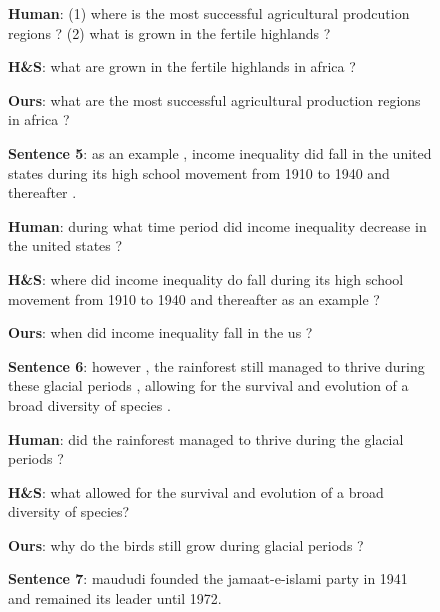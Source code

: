 \documentclass[11pt,a4paper]{article}
\begin{document}
\begin{figure}[!tb]
\begin{framed}
  \vspace{0.02cm}\noindent \textbf{Human}: (1) where is the most successful agricultural prodcution regions ? (2) what is grown in the fertile highlands ?
  
  \vspace{0.02cm} \noindent \textbf{H\&S}: what are grown in the fertile highlands in africa ?
  
  \vspace{0.02cm} \noindent \textbf{Ours}: what are the most successful agricultural production regions in africa ?
  
  \par 
  \vspace{0.4cm} 
  \noindent \textbf{Sentence 5}: as an example , income inequality did fall in the united states during its high school movement from 1910 to 1940 and thereafter . 
  
  \vspace{0.02cm}\noindent \textbf{Human}: during what time period did income inequality decrease in the united states ?
  
  \vspace{0.02cm} \noindent \textbf{H\&S}: where did income inequality do fall during its high school movement from 1910 to 1940 and thereafter as an example ?
  
  \vspace{0.02cm} \noindent \textbf{Ours}: when did income inequality fall in the us ?
  
  \par 
  \vspace{0.4cm} 
  \noindent \textbf{Sentence 6}: however , the rainforest still managed to thrive during these glacial periods , allowing for the survival and evolution of a broad diversity of species .
  
  \vspace{0.02cm}\noindent \textbf{Human}: did the rainforest managed to thrive during the glacial periods ?
  
  \vspace{0.02cm} \noindent \textbf{H\&S}: what allowed for the survival and evolution of a broad diversity of species?
  
  \vspace{0.02cm} \noindent \textbf{Ours}: why do the birds still grow during glacial periods ?
 
  \par 
  \vspace{0.4cm} 
  \noindent \textbf{Sentence 7}: maududi founded the jamaat-e-islami party in 1941 and remained its leader until 1972.
  

\end{framed}
\end{figure}
\end{document}
